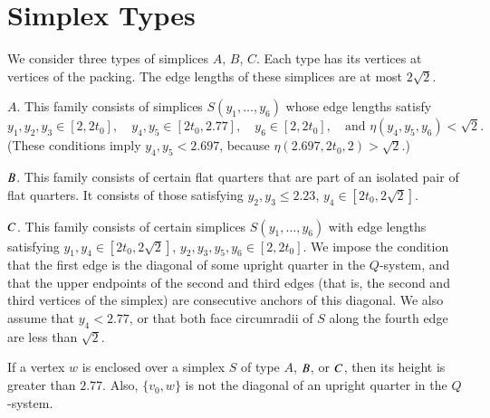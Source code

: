 \section{Simplex Types}%

We consider three types of simplices $A$, $B$, $C$.  Each type has
its vertices at vertices of the packing.  The edge lengths of
these simplices are at most $2\sqrt{2}$.

$A$.  This family consists of simplices $S(y_1,\ldots,y_6)$ whose
edge lengths satisfy
    $$
    y_1,y_2,y_3\in[2,2t_0],\quad
    y_4,y_5\in[2t_0,2.77],
    \quad
    y_6\in[2,2t_0],\quad \text{and }
    \eta(y_4,y_5,y_6)<\sqrt{2}.
    $$
(These conditions imply $y_4,y_5<2.697$, because
$\eta(2.697,2t_0,2)>\sqrt2$.)

$B$.  This family consists of certain flat quarters that are
part of an isolated pair of flat quarters. It consists of those
satisfying $y_2,y_3\le 2.23$, $y_4\in[2t_0,2\sqrt{2}]$.

$C$.  This family consists of certain simplices
$S(y_1,\ldots,y_6)$ with edge lengths satisfying
    $y_1,y_4\in[2t_0,2\sqrt{2}]$, $y_2,y_3,y_5,y_6\in[2,2t_0]$.
We impose the condition that the first edge is the diagonal of
some upright quarter in the $Q$-system, and that the upper
endpoints of the second and third edges (that is, the second and
third vertices of the simplex) are consecutive anchors of this
diagonal. We also assume that $y_4< 2.77$, or that both face
circumradii of $S$ along the fourth edge are less than $\sqrt{2}$.

\begin{lemma}
    \label{lemma:2.77}
If a vertex $w$ is enclosed over a simplex $S$ of type $A$, $B$,
or $C$, then its height is greater than $2.77$.  Also, $\{v_0,w\}$
is not the diagonal of an upright quarter in the $Q$-system.
\end{lemma}

